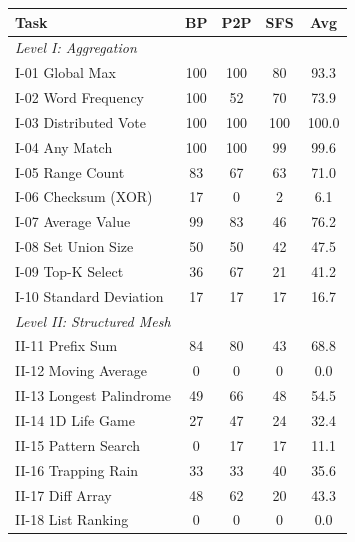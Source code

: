 \begin{table}[t]
\centering
\small
\renewcommand{\arraystretch}{1.05}
\begin{tabular}{l ccc c}
\toprule
\textbf{Task} & \textbf{BP} & \textbf{P2P} & \textbf{SFS} & \textbf{Avg} \\
\midrule
\multicolumn{5}{l}{\textit{Level I: Aggregation}} \\
I-01 Global Max & \cellcolor{gray!30}100 & \cellcolor{gray!30}100 & \cellcolor{gray!30}80 & \cellcolor{gray!30}93.3 \\
I-02 Word Frequency & \cellcolor{gray!30}100 & \cellcolor{gray!30}52 & \cellcolor{gray!30}70 & \cellcolor{gray!30}73.9 \\
I-03 Distributed Vote & \cellcolor{gray!30}100 & \cellcolor{gray!30}100 & \cellcolor{gray!30}100 & \cellcolor{gray!30}100.0 \\
I-04 Any Match & \cellcolor{gray!30}100 & \cellcolor{gray!30}100 & \cellcolor{gray!30}99 & \cellcolor{gray!30}99.6 \\
I-05 Range Count & \cellcolor{gray!30}83 & \cellcolor{gray!30}67 & \cellcolor{gray!30}63 & \cellcolor{gray!30}71.0 \\
I-06 Checksum (XOR) & 17 & 0 & 2 & 6.1 \\
I-07 Average Value & \cellcolor{gray!30}99 & \cellcolor{gray!30}83 & 46 & \cellcolor{gray!30}76.2 \\
I-08 Set Union Size & \cellcolor{gray!30}50 & \cellcolor{gray!30}50 & 42 & 47.5 \\
I-09 Top-K Select & 36 & \cellcolor{gray!30}67 & 21 & 41.2 \\
I-10 Standard Deviation & 17 & 17 & 17 & 16.7 \\
\midrule
\multicolumn{5}{l}{\textit{Level II: Structured Mesh}} \\
II-11 Prefix Sum & \cellcolor{gray!30}84 & \cellcolor{gray!30}80 & 43 & \cellcolor{gray!30}68.8 \\
II-12 Moving Average & 0 & 0 & 0 & 0.0 \\
II-13 Longest Palindrome & 49 & \cellcolor{gray!30}66 & 48 & \cellcolor{gray!30}54.5 \\
II-14 1D Life Game & 27 & 47 & 24 & 32.4 \\
II-15 Pattern Search & 0 & 17 & 17 & 11.1 \\
II-16 Trapping Rain & 33 & 33 & 40 & 35.6 \\
II-17 Diff Array & 48 & \cellcolor{gray!30}62 & 20 & 43.3 \\
II-18 List Ranking & 0 & 0 & 0 & 0.0 \\

\end{tabular}
\end{table}
